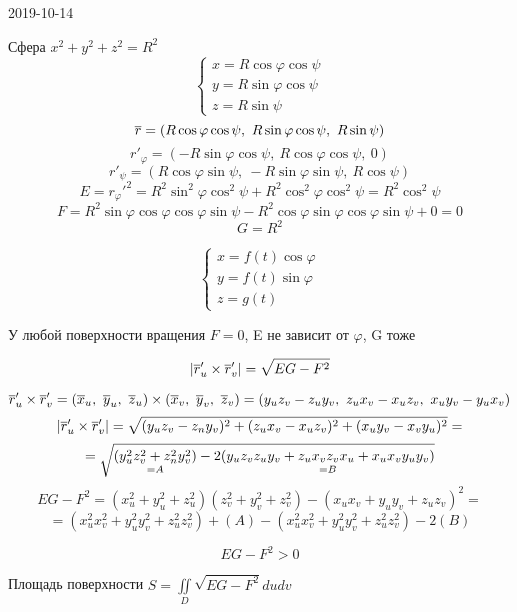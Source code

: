 \documentclass[main]{subfiles}
\begin{document}
\begin{lect} {2019-10-14}
	  \begin{example}
	    Сфера $x^2 + y^2 + z^2 = R^2$
	    \[\begin{cases}
	      x = R \cos\varphi \cos\psi\\
	      y = R \sin\varphi \cos\psi\\
	      z = R \sin\psi
	    \end{cases}\]
	    \[\overline{r} = (R \cos\varphi \cos\psi,\ R\sin\varphi \cos\psi,\ R \sin\psi)\]
	    \[r'_{\varphi} = (-R \sin\varphi \cos\psi,\ R\cos\varphi \cos\psi,\ 0)\]
	    \[r'_{\psi} = (R \cos\varphi \sin\psi,\ -R\sin\varphi \sin\psi,\ R \cos\psi)\]
	    \[E = r_{\varphi}'^2 = R^2 \sin^2 \varphi \cos^2 \psi + R^2 \cos^2 \varphi \cos^2 \psi = R^2 \cos^2 \psi\]
	    \[F = R^2 \sin\varphi \cos\varphi\cos\varphi\sin\psi - R^2 \cos\varphi \sin\varphi \cos\varphi \sin\psi + 0 = 0\]
	    \[G = R^2\]
	  \end{example}

	  \begin{Example} 
	    \[\begin{cases}
	      x = f(t) \cos\varphi\\
	      y = f(t) \sin\varphi\\
	      z = g(t)
	    \end{cases}\]
	\end{Example}

	  \begin{upr}
	    У любой поверхности вращения $F=0$, E не зависит от $\varphi$, G тоже
	  \end{upr}

	  \begin{Theorem}
	    \[|\overline{r}'_u \times \overline{r}'_v| = \sqrt{EG-F^2}\]
	  \end{Theorem}

	  \begin{Proof}
	    \[\ol{r}_u' \times \ol{r}_v' = (\ol{x}_u,\ \ol{y}_u,\ \ol{z}_u) \times (\ol{x}_v,\ \ol{y}_v,\ \ol{z}_v) = (y_u z_v - z_u y_v,\ z_u x_v - x_u z_v,\ x_u y_v - y_u x_v)\]
	    \[|\overline{r}_u' \times \overline{r}_v'| = \sqrt{(y_u z_v - z_n y_v)^2 + (z_u x_v - x_u z_v)^2 + (x_u y_v - x_v y_u)^2} = \]
	    \[= \sqrt{\underset{=A}{(y_u^2 z_v^2 + z_n^2 y_v^2)} - 2 \underset{=B}{(y_u z_v z_u y_v + z_u x_v z_v x_u + x_u x_v y_u y_v)}}\]
	    \[EG-F^2 = (x_u^2 + y_u^2 + z_u^2)(z_v^2 + y_v^2 + z_v^2) - (x_u x_v + y_u y_v + z_u z_v)^2 =\]
	    \[= (x_u^2 x_v^2 + y_u^2 y_v^2 + z_u^2 z_v^2) + (A)-(x_u^2 x_v^2 + y_u^2 y_v^2 + z_u^2 z_v^2) - 2(B)\]
	  \end{Proof}

	  \begin{Consequence}
	    \[EG-F^2 > 0\]
	  \end{Consequence}

	  \begin{theorem}
	    Площадь поверхности $S = \iint\limits_D \sqrt{EG - F^2} du dv$
	  \end{theorem}
	\end{lect}
\end{document}
